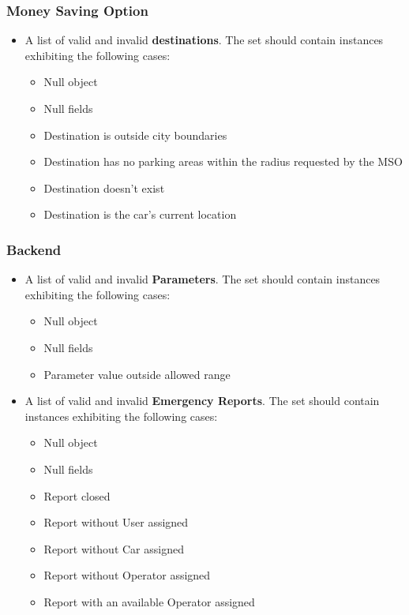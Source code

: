 		
		
		\subsubsection{Money Saving Option}
		
		\begin{itemize}
			\item A list of valid and invalid \textbf{destinations}. The set should contain instances exhibiting the following cases:
				\begin{itemize}
					\item Null object
					\item Null fields
					\item Destination is outside city boundaries
					\item Destination has no parking areas within the radius requested by the MSO
					\item Destination doesn't exist
					\item Destination is the car's current location
				\end{itemize}
		\end{itemize}
		
		
		
		\subsubsection{Backend}
		
		\begin{itemize}
			\item A list of valid and invalid \textbf{Parameters}. The set should contain instances exhibiting the following cases:
				\begin{itemize}
					\item Null object
					\item Null fields
					\item Parameter value outside allowed range
				\end{itemize}
		\end{itemize}
		
		\begin{itemize}
			\item A list of valid and invalid \textbf{Emergency Reports}. The set should contain instances exhibiting the following cases:
				\begin{itemize}
					\item Null object
					\item Null fields
					\item Report closed
					\item Report without User assigned
					\item Report without Car assigned
					\item Report without Operator assigned
					\item Report with an available Operator assigned
				\end{itemize}
		\end{itemize}